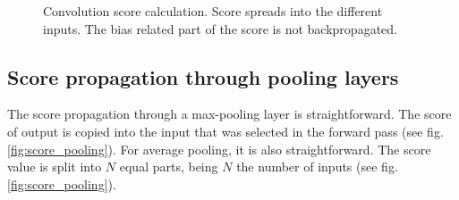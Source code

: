 \documentclass[review]{elsarticle}
\theoremstyle{definition} %
\theoremstyle{remark}
\begin{document}
\begin{figure}[!ht]
\begin{subfigure}{0.48\textwidth}
	\end{subfigure}
	\caption{Convolution score calculation. Score spreads into the different inputs. The bias related part of the score is not backpropagated.}
	\label{fig:convolution_score}
\end{figure}


\subsection{Score propagation through pooling layers}

The score propagation through a max-pooling layer is straightforward. The score of output is copied into the input that was selected in the forward pass (see fig. \ref{fig:score_pooling}). For average pooling, it is also straightforward. The score value is split into $N$ equal parts, being $N$ the number of inputs (see fig. \ref{fig:score_pooling}).
\end{document}
